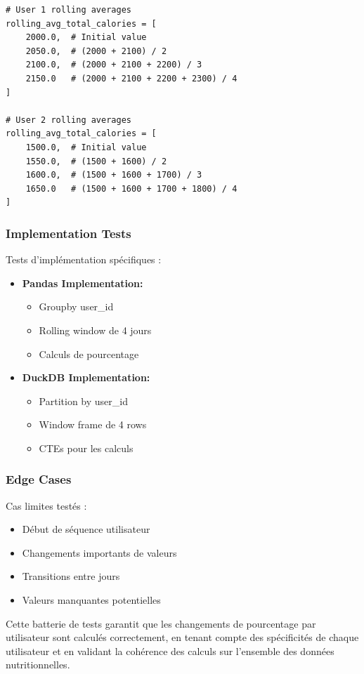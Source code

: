 \begin{lstlisting}[style=pythonstyle, caption=Expected Results]
# User 1 rolling averages
rolling_avg_total_calories = [
    2000.0,  # Initial value
    2050.0,  # (2000 + 2100) / 2
    2100.0,  # (2000 + 2100 + 2200) / 3
    2150.0   # (2000 + 2100 + 2200 + 2300) / 4
]

# User 2 rolling averages
rolling_avg_total_calories = [
    1500.0,  # Initial value
    1550.0,  # (1500 + 1600) / 2
    1600.0,  # (1500 + 1600 + 1700) / 3
    1650.0   # (1500 + 1600 + 1700 + 1800) / 4
]
\end{lstlisting}

\subsubsection{Implementation Tests}
Tests d'implémentation spécifiques :

\begin{itemize}
    \item \textbf{Pandas Implementation:}
    \begin{itemize}
        \item Groupby user\_id
        \item Rolling window de 4 jours
        \item Calculs de pourcentage
    \end{itemize}
    
    \item \textbf{DuckDB Implementation:}
    \begin{itemize}
        \item Partition by user\_id
        \item Window frame de 4 rows
        \item CTEs pour les calculs
    \end{itemize}
\end{itemize}

\subsubsection{Edge Cases}
Cas limites testés :
\begin{itemize}
    \item Début de séquence utilisateur
    \item Changements importants de valeurs
    \item Transitions entre jours
    \item Valeurs manquantes potentielles
\end{itemize}

Cette batterie de tests garantit que les changements de pourcentage par utilisateur sont calculés correctement, en tenant compte des spécificités de chaque utilisateur et en validant la cohérence des calculs sur l'ensemble des données nutritionnelles.
